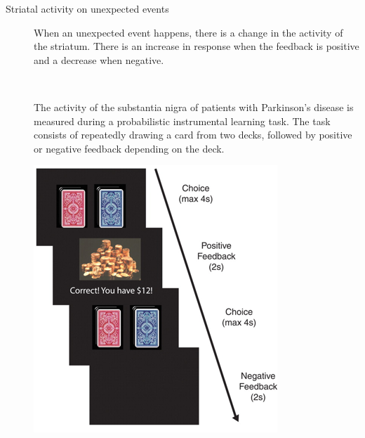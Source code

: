 \begin{description}
    \item[Striatal activity on unexpected events] 
        When an unexpected event happens, there is a change in the activity of the striatum.
        There is an increase in response when the feedback is positive and a decrease when negative.

        \begin{casestudy}
            \phantom{}\\
            \begin{minipage}{0.7\linewidth}
                The activity of the substantia nigra of patients with Parkinson's disease is measured during a probabilistic instrumental learning task.
                The task consists of repeatedly drawing a card from two decks, followed by positive or negative feedback depending on the deck.
            \end{minipage}
            \begin{minipage}{0.3\linewidth}
                \centering
                \includegraphics[width=0.95\linewidth]{./img/instrumental_dopamine_sn1.png}
            \end{minipage}


\end{casestudy}
\end{description}
